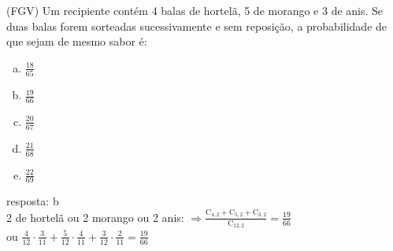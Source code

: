 \begin{ex}
 (FGV) Um recipiente contém 4 balas de hortelã, 5 de morango e 3 de anis. Se duas balas forem sorteadas sucessivamente e sem reposição, a probabilidade de que sejam de mesmo sabor é:
    \begin{enumerate}[(a)]
    \item $\frac{18}{65}$
    \item $\frac{19}{66}$
    \item $\frac{20}{67}$
    \item $\frac{21}{68}$
    \item $\frac{22}{69}$
    \end{enumerate}
      \begin{sol}
       resposta: b \\
       2 de hortelã ou 2 morango ou 2 anis: \hspace{0,2cm}$\Longrightarrow\frac{\mathrm{C}_{4,2}+\mathrm{C}_{5,2}+\mathrm{C}_{3,2}}{\mathrm{C}_{{12},2}}= \frac{19}{66}$\\
       ou  \hspace{0,4cm} $\frac{4}{12}\cdot\frac{3}{11}+\frac{5}{12}\cdot\frac{4}{11}+\frac{3}{12}\cdot\frac{2}{11}= \frac{19}{66}$
      \end{sol}
\end{ex}